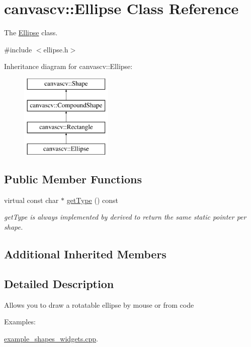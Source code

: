 \hypertarget{classcanvascv_1_1Ellipse}{}\section{canvascv\+:\+:Ellipse Class Reference}
\label{classcanvascv_1_1Ellipse}


The \hyperlink{classcanvascv_1_1Ellipse}{Ellipse} class.  




{\ttfamily \#include $<$ellipse.\+h$>$}

Inheritance diagram for canvascv\+:\+:Ellipse\+:\begin{figure}[H]
\begin{center}
\leavevmode
\includegraphics[height=4.000000cm]{classcanvascv_1_1Ellipse}
\end{center}
\end{figure}
\subsection*{Public Member Functions}
\begin{DoxyCompactItemize}
\item 
virtual const char $\ast$ \hyperlink{classcanvascv_1_1Ellipse_a15df73cf790d34b71749ec0e5d6d0331}{get\+Type} () const 
\begin{DoxyCompactList}\small\item\em get\+Type is always implemented by derived to return the same static pointer per shape. \end{DoxyCompactList}\end{DoxyCompactItemize}
\subsection*{Additional Inherited Members}


\subsection{Detailed Description}
Allows you to draw a rotatable ellipse by mouse or from code \begin{Desc}
\item[Examples\+: ]\par
\hyperlink{example_shapes_widgets_8cpp-example}{example\+\_\+shapes\+\_\+widgets.\+cpp}.\end{Desc}


